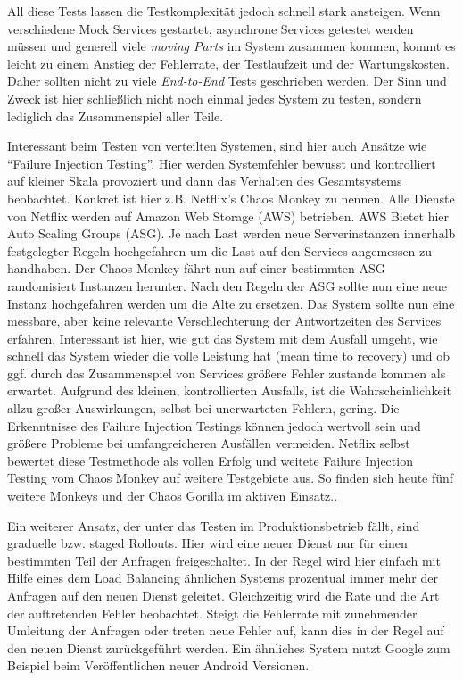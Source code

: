 All diese Tests lassen die Testkomplexität jedoch schnell stark ansteigen. Wenn verschiedene Mock Services gestartet, asynchrone Services getestet werden müssen und generell viele \textit{moving Parts} im System zusammen kommen, kommt es leicht zu einem Anstieg der Fehlerrate, der Testlaufzeit und der Wartungskosten.\cite{fowler:mstesting} Daher sollten nicht zu viele \textit{End-to-End} Tests geschrieben werden. Der Sinn und Zweck ist hier schließlich nicht noch einmal jedes System zu testen, sondern lediglich das Zusammenspiel aller Teile.

Interessant beim Testen von verteilten Systemen, sind hier auch Ansätze wie ``Failure Injection Testing''.\cite[][]{netflix:fit} Hier werden Systemfehler bewusst und kontrolliert auf kleiner Skala provoziert und dann das Verhalten des Gesamtsystems beobachtet. Konkret ist hier z.B. Netflix's Chaos Monkey\cite[][]{netflix:chaosmonkey} zu nennen. Alle Dienste von Netflix werden auf Amazon Web Storage (AWS)\cite{aws} betrieben. AWS Bietet hier Auto Scaling Groups (ASG). Je nach Last werden neue Serverinstanzen innerhalb festgelegter Regeln hochgefahren um die Last auf den Services angemessen zu handhaben. Der Chaos Monkey fährt nun auf einer bestimmten ASG randomisiert Instanzen herunter. Nach den Regeln der ASG sollte nun eine neue Instanz hochgefahren werden um die Alte zu ersetzen. Das System sollte nun eine messbare, aber keine relevante Verschlechterung der Antwortzeiten des Services erfahren. Interessant ist hier, wie gut das System mit dem Ausfall umgeht, wie schnell das System wieder die volle Leistung hat (mean time to recovery) und ob ggf. durch das Zusammenspiel von Services größere Fehler zustande kommen als erwartet. Aufgrund des kleinen, kontrollierten Ausfalls, ist die Wahrscheinlichkeit allzu großer Auswirkungen, selbst bei unerwarteten Fehlern, gering. Die Erkenntnisse des Failure Injection Testings können jedoch wertvoll sein und größere Probleme bei umfangreicheren Ausfällen vermeiden. Netflix selbst bewertet diese Testmethode als vollen Erfolg und weitete Failure Injection Testing vom Chaos Monkey auf weitere Testgebiete aus. So finden sich heute fünf weitere Monkeys und der Chaos Gorilla im aktiven Einsatz.\cite[][]{netflix:army}.

Ein weiterer Ansatz, der unter das Testen im Produktionsbetrieb fällt, sind graduelle bzw. staged Rollouts. Hier wird eine neuer Dienst nur für einen bestimmten Teil der Anfragen freigeschaltet. In der Regel wird hier einfach mit Hilfe eines dem Load Balancing ähnlichen Systems prozentual immer mehr der Anfragen auf den neuen Dienst geleitet. Gleichzeitig wird die Rate und die Art der auftretenden Fehler beobachtet. Steigt die Fehlerrate mit zunehmender Umleitung der Anfragen oder treten neue Fehler auf, kann dies in der Regel auf den neuen Dienst zurückgeführt werden. Ein ähnliches System nutzt Google zum Beispiel beim Veröffentlichen neuer Android Versionen.\cite[vgl.][]{Google:staged}

